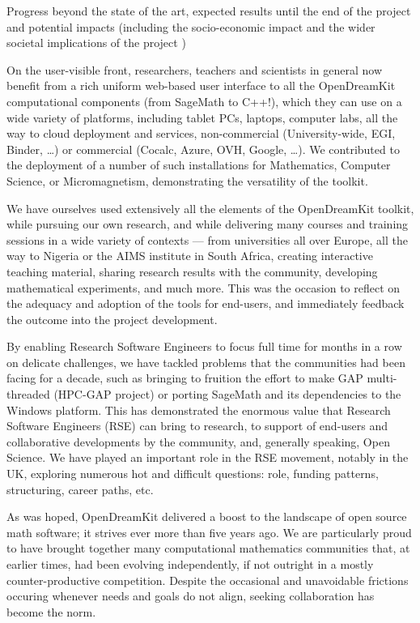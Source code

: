 Progress beyond the state of the art, expected results until the end of the project and potential impacts (including 
the socio-economic impact and the wider societal implications of the project )

On the user-visible front, researchers, teachers and scientists in general now benefit from a rich uniform web-based user 
interface to all the OpenDreamKit computational components (from SageMath to C++!), which they can use on a wide variety 
of platforms, including tablet PCs, laptops, computer labs, all the way to cloud deployment and services, non-commercial 
(University-wide, EGI, Binder, …) or commercial (Cocalc, Azure, OVH, Google, …). We contributed to the deployment of a 
number of such installations for Mathematics, Computer Science, or Micromagnetism, demonstrating the versatility of the toolkit.

We have ourselves used extensively all the elements of the OpenDreamKit toolkit, while pursuing our own research, and while 
delivering many courses and training sessions in a wide variety of contexts — from universities all over Europe, all the 
way to Nigeria or the AIMS institute in South Africa, creating interactive teaching material, sharing research results with 
the community, developing mathematical experiments, and much more.
This was the occasion to reflect on the adequacy and adoption of the tools for end-users, and immediately feedback the outcome 
into the project development.

By enabling Research Software Engineers to focus full time for months in a row on delicate challenges, we have tackled problems 
that the communities had been facing for a decade, such as bringing to fruition the effort to make GAP multi-threaded (HPC-GAP 
project) or porting SageMath and its dependencies to the Windows platform.
This has demonstrated the enormous value that Research Software Engineers (RSE) can bring to research, to support of end-users 
and collaborative developments by the community, and, generally speaking, Open Science. We have played an important role in the 
RSE movement, notably in the UK, exploring numerous hot and difficult questions: role, funding patterns, structuring, career paths, etc.

As was hoped, OpenDreamKit delivered a boost to the landscape of open source math software; it strives ever more than five 
years ago. We are particularly proud to have brought together many computational mathematics communities that, at earlier times, 
had been evolving independently, if not outright in a mostly counter-productive competition. Despite the occasional and unavoidable 
frictions occuring whenever needs and goals do not align, seeking collaboration has become the norm.

